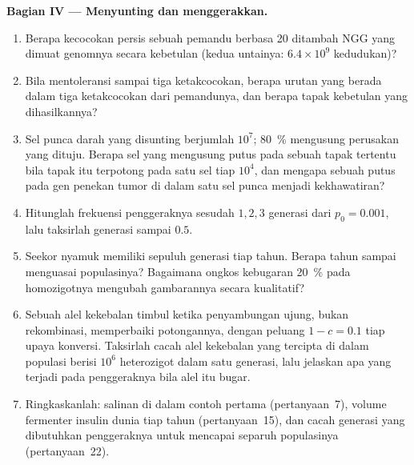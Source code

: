 \begin{problem}
\medskip
\noindent\textbf{Bagian IV --- Menyunting dan menggerakkan.}
\begin{enumerate}[resume]
  \item Berapa kecocokan persis sebuah pemandu berbasa 20 ditambah NGG yang
        dimuat genomnya secara kebetulan (kedua untainya: $6.4\times 10^{9}$
        kedudukan)?
  \item Bila  mentoleransi sampai tiga ketakcocokan, berapa urutan
        yang berada dalam tiga ketakcocokan dari pemandunya, dan berapa
        tapak  kebetulan yang dihasilkannya?
  \item Sel punca darah yang disunting berjumlah $10^{7}$; \qty{80}{\%}
        mengusung perusakan yang dituju. Berapa sel yang mengusung putus
         pada sebuah tapak tertentu bila tapak itu terpotong
        pada satu sel tiap $10^{4}$, dan mengapa sebuah putus pada gen
        penekan tumor di dalam satu sel punca menjadi kekhawatiran?
  \item Hitunglah frekuensi penggeraknya sesudah $1, 2, 3$ generasi dari
        $p_{0} = 0.001$, lalu taksirlah generasi sampai $0.5$.
  \item Seekor nyamuk memiliki sepuluh generasi tiap tahun. Berapa tahun
        sampai menguasai populasinya? Bagaimana ongkos kebugaran \qty{20}{\%}
        pada homozigotnya mengubah gambarannya secara kualitatif?
  \item Sebuah alel kekebalan timbul ketika penyambungan ujung, bukan
        rekombinasi, memperbaiki potongannya, dengan peluang $1 - c = 0.1$
        tiap upaya konversi. Taksirlah cacah alel kekebalan yang tercipta di
        dalam populasi berisi $10^{6}$ heterozigot dalam satu generasi, lalu
        jelaskan apa yang terjadi pada penggeraknya bila alel itu bugar.
  \item Ringkaskanlah: salinan di dalam contoh pertama (pertanyaan~7),
        volume fermenter insulin dunia tiap tahun (pertanyaan~15), dan
        cacah generasi yang dibutuhkan penggeraknya untuk mencapai separuh
        populasinya (pertanyaan~22).
\end{enumerate}
\end{problem}
